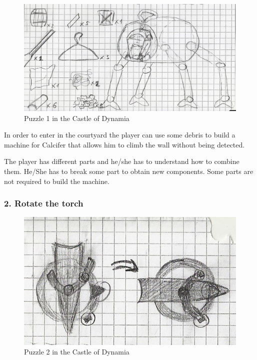 \begin{figure}[H]
  \centering
  \includegraphics[width=\textwidth]{Images/Puzzles/castleOfDynamia_1}
  \caption{Puzzle 1 in the Castle of Dynamia}
\end{figure}

In order to enter in the courtyard the player can use some debris to build a machine for Calcifer that allows him to climb the wall without being detected.

The player has different parts and he/she has to understand how to combine them. He/She has to break some part to obtain new components. Some parts are not required to build the machine.

\subsubsection*{2. Rotate the torch}

\begin{figure}[H]
  \centering
  \includegraphics[width=\textwidth]{Images/Puzzles/castleOfDynamia_2}
  \caption{Puzzle 2 in the Castle of Dynamia}
\end{figure}

